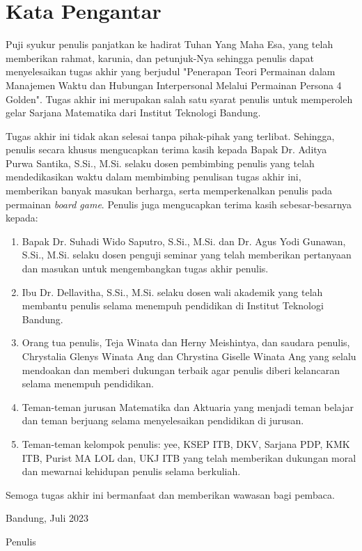 \chapter*{Kata Pengantar}

Puji syukur penulis panjatkan ke hadirat Tuhan Yang Maha Esa, yang telah memberikan rahmat, karunia, dan petunjuk-Nya sehingga penulis dapat menyelesaikan tugas akhir yang berjudul "Penerapan Teori Permainan dalam Manajemen Waktu dan Hubungan Interpersonal Melalui Permainan Persona 4 Golden". Tugas akhir ini merupakan salah satu syarat penulis untuk memperoleh gelar Sarjana Matematika dari Institut Teknologi Bandung.

Tugas akhir ini tidak akan selesai tanpa pihak-pihak yang terlibat. Sehingga, penulis secara khusus mengucapkan terima kasih kepada Bapak Dr. Aditya Purwa Santika, S.Si., M.Si. selaku dosen pembimbing penulis yang telah mendedikasikan waktu dalam membimbing penulisan tugas akhir ini, memberikan banyak masukan berharga, serta memperkenalkan penulis pada permainan \textit{board game}. Penulis juga mengucapkan terima kasih sebesar-besarnya kepada:
\begin{enumerate}
    \item Bapak Dr. Suhadi Wido Saputro, S.Si., M.Si. dan Dr. Agus Yodi Gunawan, S.Si., M.Si. selaku dosen penguji seminar yang telah memberikan pertanyaan dan masukan untuk mengembangkan tugas akhir penulis.
    \item Ibu Dr. Dellavitha, S.Si., M.Si. selaku dosen wali akademik yang telah membantu penulis selama menempuh pendidikan di Institut Teknologi Bandung.
    \item Orang tua penulis, Teja Winata dan Herny Meishintya, dan saudara penulis, Chrystalia Glenys Winata Ang dan Chrystina Giselle Winata Ang yang selalu mendoakan dan memberi dukungan terbaik agar penulis diberi kelancaran selama menempuh pendidikan.
    \item Teman-teman jurusan Matematika dan Aktuaria yang menjadi teman belajar dan teman berjuang selama menyelesaikan pendidikan di jurusan.
    \item Teman-teman kelompok penulis: yee, KSEP ITB, DKV, Sarjana PDP, KMK ITB, Purist MA LOL dan, UKJ ITB yang telah memberikan dukungan moral dan mewarnai kehidupan penulis selama berkuliah.
\end{enumerate}

Semoga tugas akhir ini bermanfaat dan memberikan wawasan bagi pembaca.

\hfill{Bandung, Juli 2023}

\hfill{Penulis}